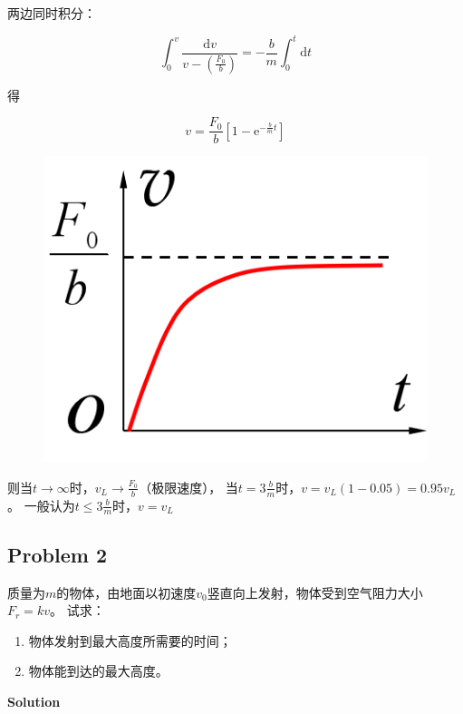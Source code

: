 \documentclass[
	12pt, %
	a4paper, %
]{myLegrandOrangeBook}
\newcommand{\rmd}{\mathrm{d}}
\begin{document}
    两边同时积分：

    $$
        \int_0^v \frac{\rmd v}{v-\left(\frac{F_0}{b}\right)}=-\frac{b}{m} \int_0^t \rmd t
    $$

    得

    $$
        v=\frac{F_0}{b}\left[1-\mathrm{e}^{-\frac{b}{m} t}\right]
    $$

    \begin{figure}
        \centering
        \includegraphics[scale=0.3]{"Chapter 02 images/pic3.png"}
        \label{pic3}
    \end{figure}

    则当\(t \rightarrow \infty\)时，\(v_{L} \rightarrow \frac{F_{0}}{b}\)（极限速度），
    当\(t = 3 \frac{b}{m}\)时，\(v = v_{L}\left(1-0.05\right) = 0.95 v_{L}\)。
    一般认为\(t \leq 3 \frac{b}{m}\)时，\(v = v_{L}\)

\subsection{Problem 2}

    质量为\(m\)的物体，由地面以初速度\(v_{0}\)竖直向上发射，物体受到空气阻力大小\(F_{r} = kv\)。
    试求：

    \begin{enumerate}
        \item 物体发射到最大高度所需要的时间；
        \item 物体能到达的最大高度。
    \end{enumerate}

    \textbf{Solution}
    \\
\end{document}
